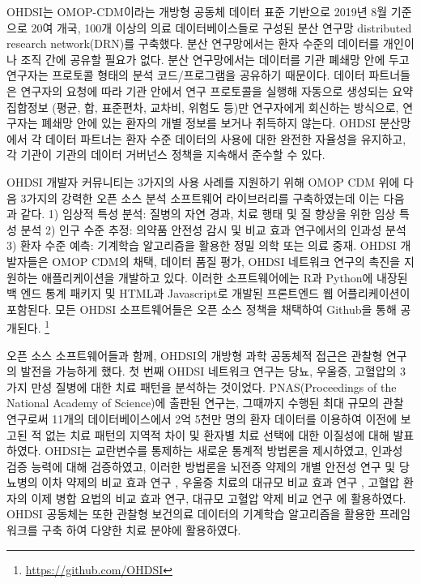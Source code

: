 \documentclass[10.5pt]{book}
\let\rmarkdownfootnote\footnote%
\def\footnote{\protect\rmarkdownfootnote}
\theoremstyle{definition}
\theoremstyle{definition}
\theoremstyle{definition}
\theoremstyle{remark}
\begin{document}
OHDSI는 OMOP-CDM이라는 개방형 공동체 데이터 표준 기반으로 2019년 8월
기준으로 20여 개국, 100개 이상의 의료 데이터베이스들로 구성된 분산
연구망 distributed research network(DRN)를 구축했다. 분산 연구망에서는
환자 수준의 데이터를 개인이나 조직 간에 공유할 필요가 없다. 분산
연구망에서는 데이터를 기관 폐쇄망 안에 두고 연구자는 프로토콜 형태의
분석 코드/프로그램을 공유하기 때문이다. 데이터 파트너들은 연구자의
요청에 따라 기관 안에서 연구 프로토콜을 실행해 자동으로 생성되는 요약
집합정보 (평균, 합, 표준편차, 교차비, 위험도 등)만 연구자에게 회신하는
방식으로, 연구자는 폐쇄망 안에 있는 환자의 개별 정보를 보거나 취득하지
않는다. OHDSI 분산망에서 각 데이터 파트너는 환자 수준 데이터의 사용에
대한 완전한 자율성을 유지하고, 각 기관이 기관의 데이터 거버넌스 정책을
지속해서 준수할 수 있다.

OHDSI 개발자 커뮤니티는 3가지의 사용 사례를 지원하기 위해 OMOP CDM 위에
다음 3가지의 강력한 오픈 소스 분석 소프트웨어 라이브러리를 구축하였는데
이는 다음과 같다. 1) 임상적 특성 분석: 질병의 자연 경과, 치료 행태 및 질
향상을 위한 임상 특성 분석 2) 인구 수준 추정: 의약품 안전성 감시 및 비교
효과 연구에서의 인과성 분석 3) 환자 수준 예측: 기계학습 알고리즘을
활용한 정밀 의학 또는 의료 중재. OHDSI 개발자들은 OMOP CDM의 채택,
데이터 품질 평가, OHDSI 네트워크 연구의 촉진을 지원하는 애플리케이션을
개발하고 있다. 이러한 소프트웨어에는 R과 Python에 내장된 백 엔드 통계
패키지 및 HTML과 Javascript로 개발된 프론트엔드 웹 어플리케이션이
포함된다. 모든 OHDSI 소프트웨어들은 오픈 소스 정책을 채택하여 Github을
통해 공개된다. \footnote{\url{https://github.com/OHDSI}}

오픈 소스 소프트웨어들과 함께, OHDSI의 개방형 과학 공동체적 접근은
관찰형 연구의 발전을 가능하게 했다. 첫 번째 OHDSI 네트워크 연구는 당뇨,
우울증, 고혈압의 3가지 만성 질병에 대한 치료 패턴을 분석하는 것이었다.
PNAS(Proceedings of the National Academy of Science)에 출판된 연구는,
그때까지 수행된 최대 규모의 관찰 연구로써 11개의 데이터베이스에서 2억
5천만 명의 환자 데이터를 이용하여 이전에 보고된 적 없는 치료 패턴의
지역적 차이 및 환자별 치료 선택에 대한 이질성에 대해 발표하였다.
\citep{Hripcsak7329} OHDSI는 교란변수를 통제하는 새로운 통계적 방법론을
제시하였고, \citep{tian_2018} 인과성 검증 능력에 대해 검증하였고,
\citep{schuemie_2018} 이러한 방법론을 뇌전증 약제의 개별 안전성 연구
\citep{duke_2017} 및 당뇨병의 이차 약제의 비교 효과 연구
\citep{vashisht_2018}, 우울증 치료의 대규모 비교 효과 연구
\citep{schuemie_2018b}, 고혈압 환자의 이제 병합 요법의 비교 효과
연구\citep{you_olmesartan_2019}, 대규모 고혈압 약제 비교 연구
\citep{suchard_comprehensive_2019} 에 활용하였다. OHDSI 공동체는 또한
관찰형 보건의료 데이터의 기계학습 알고리즘을 활용한 프레임 워크를 구축
\citep{reps2018} 하여 다양한 치료 분야에 활용하였다.
\citep{johnston_2019, cepeda_2018, reps_2019}
\end{document}
